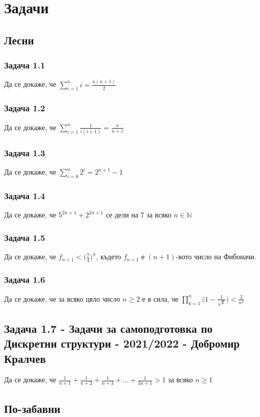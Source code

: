 \documentclass[12pt]{article}
\begin{document}
\section*{Задачи}

\subsection*{Лесни}
\subsubsection*{Задача 1.1}
Да се докаже, че $\displaystyle\sum_{i=1}^{n} i = \frac{n(n+1)}{2}$
\subsubsection*{Задача 1.2}
Да се докаже, че $\displaystyle\sum_{i=1}^{n} \frac{1}{i(i+1)} = \frac{n}{n+1}$
\subsubsection*{Задача 1.3}
Да се докаже, че $\displaystyle\sum_{i=0}^{n} 2^i = 2^{n+1} - 1$
\subsubsection*{Задача 1.4}
Да се докаже, че $5^{2n + 1} + 2^{2n+1}$ се дели на $7$ за всяко $n \in \mathbb{N}$
\subsubsection*{Задача 1.5}
Да се докаже, че $f_{n+1} < \biggl( \frac{7}{4} \biggr)^n$, където $f_{n+1}$ е $(n+1)$-вото число на Фибоначи.
\subsubsection*{Задача 1.6}
Да се докаже, че за всяко цяло число $n \geq 2$ е в сила, че $\displaystyle\prod_{k=1}^n \biggl(1 - \frac{1}{\sqrt{k}}\biggr) < \frac{2}{n^2}$
\subsection*{Задача 1.7 - Задачи за самоподготовка по Дискретни структури - 2021/2022 - Добромир Кралчев}
Да се докаже, че $\frac{1}{n+1} + \frac{1}{n+2} + \frac{1}{n+3} + ... + \frac{1}{3n + 1} > 1$ за всяко $n \geq 1$

\subsection*{По-забавни}
\end{document}
